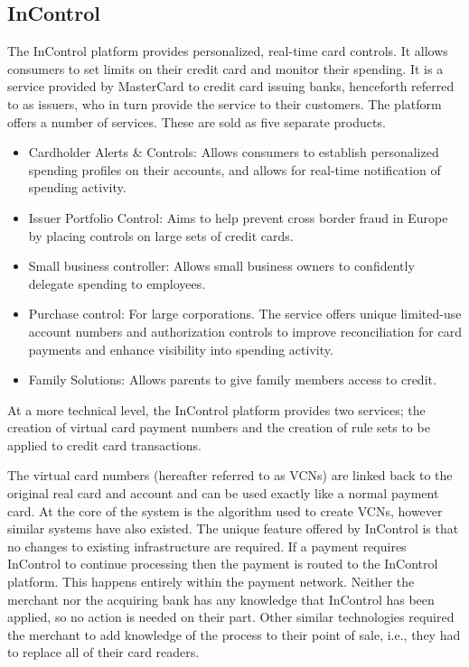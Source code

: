\documentclass[a4paper, 11pt, titlepage]{article}
\begin{document}
\subsection{InControl} 
The InControl platform provides personalized, real-time card controls. It allows consumers to set limits on their credit card and monitor their spending. It is a service provided by MasterCard to credit card issuing banks, henceforth referred to as issuers, who in turn provide the service to their customers. The platform offers a number of services. These are sold as five separate products. 
\begin{itemize} 
\item Cardholder Alerts & Controls: Allows consumers to establish personalized spending profiles on their accounts, and allows for real-time notification of spending activity. 
\item Issuer Portfolio Control: Aims to help prevent cross border fraud in Europe by placing controls on large sets of credit cards. 
\item Small business controller: Allows small business owners to confidently delegate spending to employees. 
\item Purchase control: For large corporations. The service offers unique limited-use account numbers and authorization controls to improve reconciliation for card payments and enhance visibility into spending activity. 
\item Family Solutions: Allows parents to give family members access to credit. 
\end{itemize} 
 
At a more technical level, the InControl platform provides two services; the creation of virtual card payment numbers and the creation of rule sets to be applied to credit card transactions. 
 
The virtual card numbers (hereafter referred to as VCNs) are linked back to the original real card and account and can be used exactly like a normal payment card. At the core of the system is the algorithm used to create VCNs, however similar systems have also existed. The unique feature offered by InControl is that no changes to existing infrastructure are required. If a payment requires InControl to continue processing then the payment is routed to the InControl platform. This happens entirely within the payment network. Neither the merchant nor the acquiring bank has any knowledge that InControl has been applied, so no action is needed on their part. Other similar technologies required the merchant to add knowledge of the process to their point of sale, i.e., they had to replace all of their card readers. 
 
\end{document}
